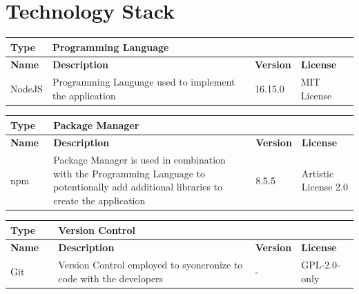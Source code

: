 \documentclass[12pt, a4paper]{article}
\begin{document}
\section{Technology Stack}
\begin{center}
\begin{tabular}{|p{1.5cm}|p{9cm}|p{1.5cm}|p{2cm}|}
\hline
\textbf{Type} & Programming Language & & \\
\hline
\textbf{Name} & \textbf{Description} & \textbf{Version} & \textbf{License}\\
\hline
NodeJS & Programming Language used to implement the application & 16.15.0 & MIT License\\
\hline
\end{tabular}\vspace{1cm}

\begin{tabular}{|p{1.5cm}|p{9cm}|p{1.5cm}|p{2cm}|}
    \hline
    \textbf{Type} & Package Manager & & \\
    \hline
    \textbf{Name} & \textbf{Description} & \textbf{Version} & \textbf{License}\\
    \hline
    npm\textcolor{white}{aaa} & Package Manager is used in combination with the Programming Language to potentionally add additional libraries to create the application & 8.5.5 & Artistic License 2.0\\
    \hline
\end{tabular}\vspace{1cm}

\begin{tabular}{|p{1.5cm}|p{9cm}|p{1.5cm}|p{2cm}|}
    \hline
    \textbf{Type} & Version Control & & \\
    \hline
    \textbf{Name} & \textbf{Description} & \textbf{Version} & \textbf{License}\\
    \hline
    Git\textcolor{white}{aaaaa} & Version Control employed to syoncronize to code with the developers  & - & GPL-2.0-only\\
    \hline
\end{tabular}


\end{center}
\end{document}
